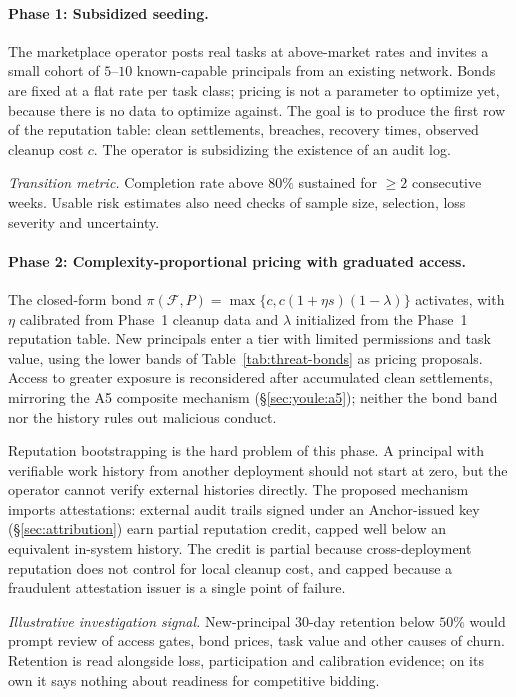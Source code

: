 \documentclass[11pt,a4paper]{article}
\theoremstyle{definition}
\theoremstyle{remark}
\begin{document}
\paragraph{Phase 1: Subsidized seeding.}
The marketplace operator posts real tasks at above-market rates and invites a small cohort of $5$--$10$ known-capable principals from an existing network. Bonds are fixed at a flat rate per task class; pricing is not a parameter to optimize yet, because there is no data to optimize against. The goal is to produce the first row of the reputation table: clean settlements, breaches, recovery times, observed cleanup cost $c$. The operator is subsidizing the existence of an audit log.

\emph{Transition metric.} Completion rate above $80\%$ sustained for $\geq 2$ consecutive weeks. Usable risk estimates also need checks of sample size,
selection, loss severity and uncertainty.

\paragraph{Phase 2: Complexity-proportional pricing with graduated access.}
The closed-form bond $\pi(\mathcal{F}, P) = \max\{c,c(1 + \eta s)(1 - \lambda)\}$ activates, with $\eta$ calibrated from Phase~1 cleanup data and $\lambda$ initialized from the Phase~1 reputation table. New principals enter a tier with limited permissions and task value, using the lower bands of Table~\ref{tab:threat-bonds} as pricing proposals. Access to greater exposure is reconsidered after accumulated clean settlements, mirroring the A5 composite mechanism (\S\ref{sec:youle:a5}); neither the bond band nor the history rules out malicious conduct.

Reputation bootstrapping is the hard problem of this phase. A principal with verifiable work history from another deployment should not start at zero, but the operator cannot verify external histories directly. The proposed mechanism imports attestations: external audit trails signed under an Anchor-issued key (\S\ref{sec:attribution}) earn partial reputation credit, capped well below an equivalent in-system history. The credit is partial because cross-deployment reputation does not control for local cleanup cost, and capped because a fraudulent attestation issuer is a single point of failure.

\emph{Illustrative investigation signal.} New-principal $30$-day retention
below $50\%$ would prompt review of access gates, bond prices, task value and
other causes of churn. Retention is read alongside loss, participation and
calibration evidence; on its own it says nothing about readiness for
competitive bidding.
\end{document}
